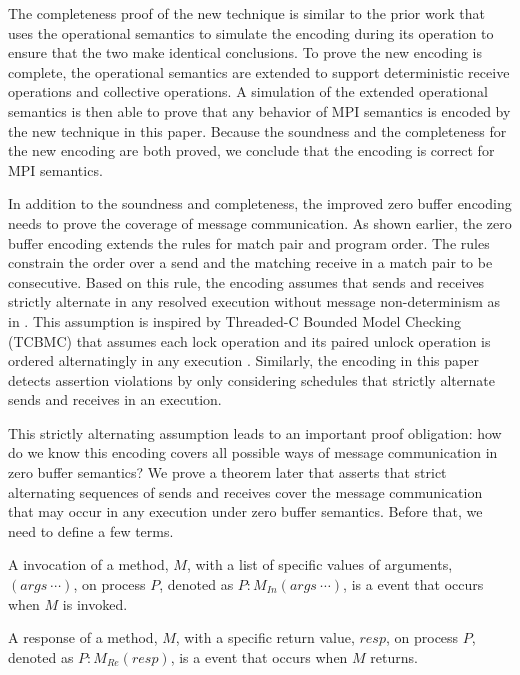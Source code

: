 The completeness proof of the new technique is similar to the prior work that uses the operational semantics to simulate the encoding during its operation to ensure that the two make identical conclusions. To prove the new encoding is complete, the operational semantics are extended to support deterministic receive operations and collective operations. A simulation of the extended operational semantics is then able to prove that any behavior of MPI semantics is encoded by the new technique in this paper. Because the soundness and the completeness for the new encoding are both proved, we conclude that the encoding is correct for MPI semantics. 

In addition to the soundness and completeness, the improved zero buffer encoding needs to prove the coverage of message communication. As shown earlier, the zero buffer encoding extends the rules for match pair and program order. The rules constrain the order over a send and the matching receive in a match pair to be consecutive. Based on this rule, the encoding assumes that sends and receives strictly alternate in any resolved execution without message non-determinism as in . This assumption is inspired by Threaded-C Bounded Model Checking (TCBMC) that assumes each lock operation and its paired unlock operation is ordered alternatingly in any execution \cite{DBLP:conf/cav/RabinovitzG05}. Similarly, the encoding in this paper detects assertion violations by only considering schedules that strictly alternate sends and receives in an execution. 

This strictly alternating assumption leads to an important proof obligation: how do we know this encoding covers all possible ways of message communication in zero buffer semantics? We prove a theorem later that asserts that strict alternating sequences of sends and receives cover the message communication that may occur in any execution under zero buffer semantics. Before that, we need to define a few terms.

\begin{definition}\label{def:invocation}
A invocation of a method, $M$, with a list of specific values of arguments, $(args\ \cdots)$, on process $P$, denoted as $P:M_\mathit{In}(args\ \cdots)$, is a event that occurs when $M$ is invoked. 
\end{definition}

\begin{definition}\label{def:response}
A response of a method, $M$, with a specific return value, $resp$, on process $P$, denoted as $P:M_\mathit{Re}(resp)$, is a event that occurs when $M$ returns. 
\end{definition}

